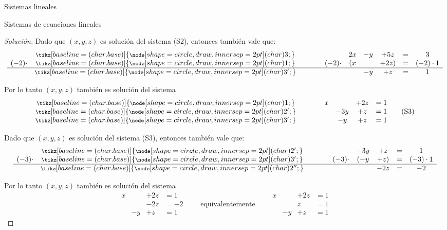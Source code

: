 \documentclass[a4paper,12pt,twoside,spanish,reqno]{amsbook}
\numberwithin{equation}{section}
\theoremstyle{definition}
\theoremstyle{remark}
\newcommand \circled[1]{\tikz[baseline=(char.base)]{
        \node[shape=circle,draw,inner sep=2pt] (char) {#1};}}
\begin{document}
\begin{chapter}{Sistemas lineales}
\begin{section}{Sistemas de ecuaciones lineales}
\begin{proof}[Solución]
 
Dado que $(x,y,z)$ es solución del sistema (S2),  entonces también vale que:
\begin{equation*}
\begin{matrix}
&{\footnotesize{\footnotesize\circled{3}}}&\qquad&&2x& -y & +5z & = &3 \\
(-2)\cdot&{\footnotesize{\footnotesize\circled{1}}}&\qquad&(-2)\cdot&(x &  & +2z) & = &(-2)\cdot1 \\
\hline
&{\footnotesize{\footnotesize\circled{3'}}}&\qquad&& & -y & + z & = & 1  
\end{matrix}
\end{equation*}
 

Por lo tanto $(x,y,z)$ también es solución del sistema
\begin{equation*}
\begin{matrix}
{\footnotesize{\footnotesize\circled{1}}}&\qquad&x &  & +2z & = 1 \\
{\footnotesize{\footnotesize\circled{2'}}}&\qquad&& -3y & +z & = 1   \\
{\footnotesize{\footnotesize\circled{3'}}}&\qquad&& -y & +z & =1
\end{matrix}\tag{S3}
\end{equation*}
 

 
Dado que $(x,y,z)$ es solución del sistema (S3), entonces también vale que: 
\begin{equation*}
\begin{matrix}
&{\footnotesize{\footnotesize\circled{2'}}}&\qquad&& -3y & +z & = & 1 \\
(-3)\cdot&{\footnotesize{\footnotesize\circled{3'}}}&\qquad&(-3)\cdot&( -y & +z) & = &(-3)\cdot1 \\
\hline
&{\footnotesize{\footnotesize\circled{2''}}}&\qquad&&   & -2z & = & -2  
\end{matrix}
\end{equation*}

 
Por lo tanto $(x,y,z)$ también es solución del sistema
\begin{equation*}
\begin{matrix}
x &  & +2z & = 1 \\
&    & -2z & = -2\\
& -y & +z & =1 
\end{matrix}
\qquad\mbox{equivalentemente}\qquad
\begin{matrix}
x &  & +2z & = 1 \\
&    & z & = 1\\
& -y & +z & =1 
\end{matrix}
\end{equation*}
 


\end{proof}
\end{section}
\end{chapter}
\end{document}
